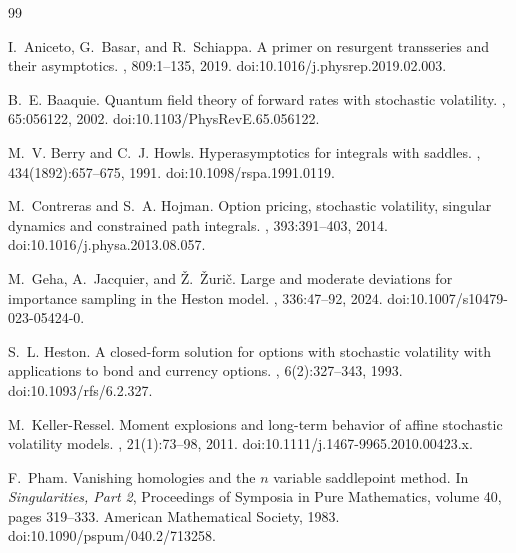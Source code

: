 \documentclass[11pt]{article}
\begin{document}
\begin{thebibliography}{99}

I.~Aniceto, G.~Basar, and R.~Schiappa.
\newblock A primer on resurgent transseries and their asymptotics.
, 809:1--135, 2019.
\newblock doi:10.1016/j.physrep.2019.02.003.

B.~E. Baaquie.
\newblock Quantum field theory of forward rates with stochastic volatility.
, 65:056122, 2002.
\newblock doi:10.1103/PhysRevE.65.056122.

M.~V. Berry and C.~J. Howls.
\newblock Hyperasymptotics for integrals with saddles.
, 434(1892):657--675, 1991.
\newblock doi:10.1098/rspa.1991.0119.

M.~Contreras and S.~A. Hojman.
\newblock Option pricing, stochastic volatility, singular dynamics and constrained path integrals.
, 393:391--403, 2014.
\newblock doi:10.1016/j.physa.2013.08.057.

M.~Geha, A.~Jacquier, and \v{Z}.~\v{Z}uri\v{c}.
\newblock Large and moderate deviations for importance sampling in the Heston model.
, 336:47--92, 2024.
\newblock doi:10.1007/s10479-023-05424-0.

S.~L. Heston.
\newblock A closed-form solution for options with stochastic volatility with applications to bond and currency options.
, 6(2):327--343, 1993.
\newblock doi:10.1093/rfs/6.2.327.

M.~Keller-Ressel.
\newblock Moment explosions and long-term behavior of affine stochastic volatility models.
, 21(1):73--98, 2011.
\newblock doi:10.1111/j.1467-9965.2010.00423.x.

F.~Pham.
\newblock Vanishing homologies and the $n$ variable saddlepoint method.
\newblock In {\em Singularities, Part 2}, Proceedings of Symposia in Pure Mathematics, volume 40, pages 319--333. American Mathematical Society, 1983.
\newblock doi:10.1090/pspum/040.2/713258.


\end{thebibliography}
\end{document}
